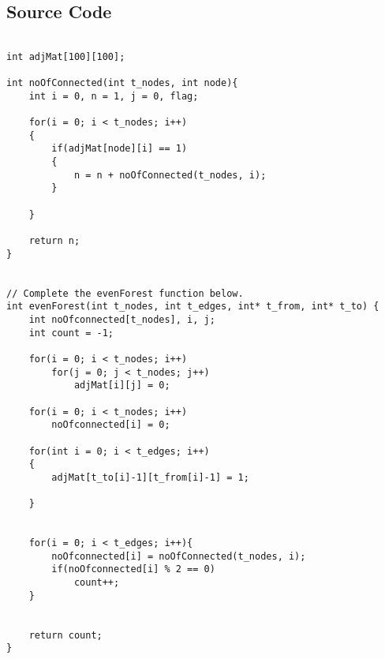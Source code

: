 \documentclass{article}
\begin{document}
\subsection{Source Code}
\begin{verbatim}

int adjMat[100][100];

int noOfConnected(int t_nodes, int node){
    int i = 0, n = 1, j = 0, flag;
    
    for(i = 0; i < t_nodes; i++)
    {
        if(adjMat[node][i] == 1)
        {
            n = n + noOfConnected(t_nodes, i);
        }
        
    }
    
    return n;
}


// Complete the evenForest function below.
int evenForest(int t_nodes, int t_edges, int* t_from, int* t_to) {
    int noOfconnected[t_nodes], i, j;
    int count = -1;
    
    for(i = 0; i < t_nodes; i++)
        for(j = 0; j < t_nodes; j++)
            adjMat[i][j] = 0;
    
    for(i = 0; i < t_nodes; i++)
        noOfconnected[i] = 0;
    
    for(int i = 0; i < t_edges; i++)
    {
        adjMat[t_to[i]-1][t_from[i]-1] = 1;
    
    }
    
    
    for(i = 0; i < t_edges; i++){
        noOfconnected[i] = noOfConnected(t_nodes, i);
        if(noOfconnected[i] % 2 == 0)
            count++;
    }
    
    
    return count;
}


\end{verbatim}
\end{document}
